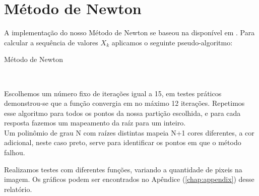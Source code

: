 
\chapter{Método de Newton}\label{partes:newtonMethod}

  A implementação do nosso Método de Newton se baseou na disponível em \cite{numericalMethods}. Para calcular a sequência de valores $X_k$ aplicamos o seguinte pseudo-algoritmo:

  \begin{algorithm}
    \caption{Método de Newton}\label{euclid}
    \begin{algorithmic}[1]
        \Else
          \\
          \EndIf
        \EndIf
      \EndWhile
    \EndProcedure
    \end{algorithmic}
  \end{algorithm}

  Escolhemos um número fixo de iterações igual a 15, em testes práticos demonstrou-se que a função convergia em no máximo 12 iterações. Repetimos esse algoritmo para todos os pontos da nossa partição escolhida, e para cada resposta fazemos um mapeamento da raíz para um inteiro. \\

  Um polinômio de grau N com raízes distintas mapeia N+1 cores diferentes, a cor adicional, neste caso preto, serve para identificar os pontos em que o método falhou.

  Realizamos testes com diferentes funções, variando a quantidade de pixeis na imagem. Os gráficos podem ser encontrados no Apêndice (\ref{chap:appendix}) desse relatório.

